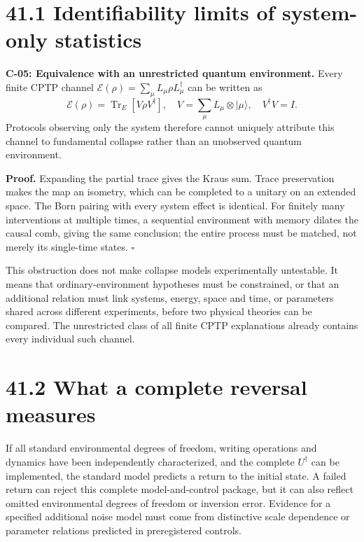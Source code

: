 \documentclass[
  11pt,
  oneside]{book}
\begin{document}
\section{41.1 Identifiability limits of system-only statistics}

\label{c-05}{}

\textbf{C-05: Equivalence with an unrestricted quantum environment.}
Every finite CPTP channel
\(\mathcal E(\rho)=\sum_\mu L_\mu\rho L_\mu^\dagger\) can be written as
\[
\mathcal E(\rho)=\operatorname{Tr}_E[V\rho V^\dagger],
\quad V=\sum_\mu L_\mu\otimes|\mu\rangle,\quad V^\dagger V=I.
\tag{41.1}
\] Protocols observing only the system therefore cannot uniquely
attribute this channel to fundamental collapse rather than an unobserved
quantum environment.

\textbf{Proof.} Expanding the partial trace gives the Kraus sum. Trace
preservation makes the map an isometry, which can be completed to a
unitary on an extended space. The Born pairing with every system effect
is identical. For finitely many interventions at multiple times, a
sequential environment with memory dilates the causal comb, giving the
same conclusion; the entire process must be matched, not merely its
single-time states. \(\square\)

This obstruction does not make collapse models experimentally
untestable. It means that ordinary-environment hypotheses must be
constrained, or that an additional relation must link systems, energy,
space and time, or parameters shared across different experiments,
before two physical theories can be compared. The unrestricted class of
all finite CPTP explanations already contains every individual such
channel.

\section{41.2 What a complete reversal measures}

If all standard environmental degrees of freedom, writing operations and
dynamics have been independently characterized, and the complete
\(U^\dagger\) can be implemented, the standard model predicts a return
to the initial state. A failed return can reject this complete
model-and-control package, but it can also reflect omitted environmental
degrees of freedom or inversion error. Evidence for a specified
additional noise model must come from distinctive scale dependence or
parameter relations predicted in preregistered controls.
\end{document}
